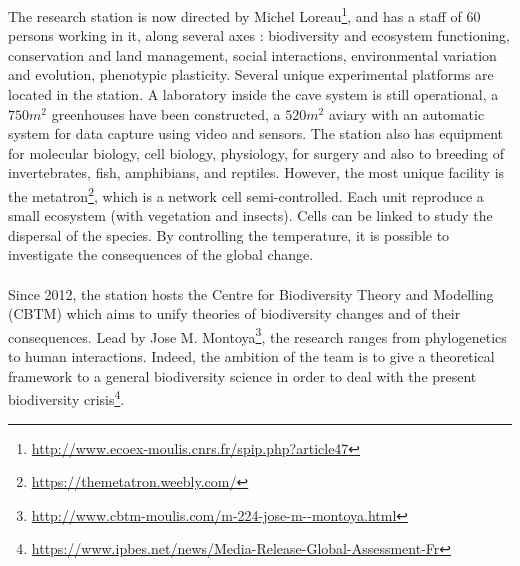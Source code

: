 \documentclass{article}
\begin{document}
The research station is now directed by Michel Loreau\footnote{\url{http://www.ecoex-moulis.cnrs.fr/spip.php?article47}}, and has a staff of 60 persons working in it, along several axes : biodiversity and ecosystem functioning, conservation and land management, social interactions, environmental variation and evolution, phenotypic plasticity. 
Several unique experimental platforms are located in the station. A laboratory inside the cave system is still operational, a $750m^2$ greenhouses have been constructed, a $520m^2$ aviary with an automatic system for data capture using video and sensors.
The station also has equipment for molecular biology, cell biology, physiology, for surgery and also to breeding of invertebrates, fish, amphibians, and reptiles. However, the most unique facility is the metatron\footnote{\url{https://themetatron.weebly.com/}}, which is a network cell semi-controlled. 
Each unit reproduce a small ecosystem (with vegetation and insects). Cells can be linked to study the dispersal of the species. By controlling the temperature, it is possible to investigate the consequences of the global change.



\paragraph{}
Since 2012, the station hosts the Centre for Biodiversity Theory and Modelling (CBTM)  
which aims to unify theories of biodiversity changes and of their consequences. 
Lead by Jose M. Montoya\footnote{\url{http://www.cbtm-moulis.com/m-224-jose-m--montoya.html}}, the research ranges from phylogenetics to human interactions. Indeed, the ambition of the team is to give a theoretical framework to a general biodiversity science in order to deal with the present biodiversity crisis\footnote{\url{https://www.ipbes.net/news/Media-Release-Global-Assessment-Fr}}.
\end{document}
